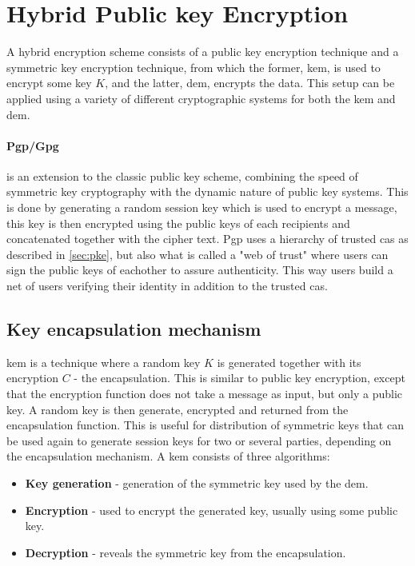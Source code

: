 \section{Hybrid Public key Encryption}\label{sec:hybrid}
A hybrid encryption scheme \cite{hybrid_enc} consists of a public key encryption technique and a symmetric key encryption technique, from which the former, \gls{kem}, is used to encrypt some key $K$, and the latter, \gls{dem}, encrypts the data. This setup can be applied using a variety of different cryptographic systems for both the \gls{kem} and \gls{dem}. 

\paragraph{Pgp/Gpg}\label{pgp}\cite{openpgp, koch2003gnu} is an extension to the classic public key scheme, combining the speed of symmetric key cryptography with the dynamic nature of public key systems. This is done by generating a random session key which is used to encrypt a message, this key is then encrypted using the public keys of each recipients and concatenated together with the cipher text. Pgp uses a hierarchy of trusted \glspl{ca} as described in \ref{sec:pke}, but also what is called a "web of trust" where users can sign the public keys of eachother to assure authenticity. This way users build a net of users verifying their identity in addition to the trusted \glspl{ca}.

\subsection{Key encapsulation mechanism}
\Gls{kem} \cite{kem_kurosawaP14} is a technique where a random key $K$ is generated together with its encryption $C$ - the encapsulation. This is similar to public key encryption, except that the encryption function does not take a message as input, but only a public key. A random key is then generate, encrypted and returned from the encapsulation function. This is useful for distribution of symmetric keys that can be used again to generate session keys for two or several parties, depending on the encapsulation mechanism. A \gls{kem} consists of three algorithms:
\begin{itemize}
\item \textbf{ Key generation } - generation of the symmetric key used by the \gls{dem}.
\item \textbf{ Encryption } - used to encrypt the generated key, usually using some public key.
\item \textbf{ Decryption } - reveals the symmetric key from the encapsulation.
\end{itemize}



